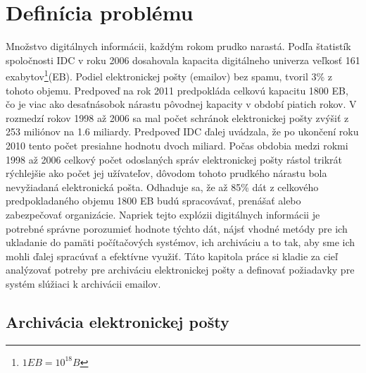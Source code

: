 \documentclass[11pt,twoside,a4paper]{book}
\begin{document}
\chapter{Definícia problému}

Množstvo digitálnych informácii, každým rokom prudko narastá. Podľa štatistík spoločnosti IDC\cite{Gantz_Mcarthur_Minton_2007} v roku 2006 dosahovala kapacita digitálneho univerza veľkosť 161 exabytov\footnote{$1 EB = 10^{18}B$}(EB). Podiel elektronickej pošty (emailov) bez spamu, tvoril 3\% z tohoto objemu. Predpoveď na rok 2011\cite{Gantz_Chute_Manfrediz_Minton_Reinsel_Schlichting_Toncheva_2008} predpokláda celkovú kapacitu 1800 EB, čo je viac ako desaťnásobok nárastu pôvodnej kapacity v období piatich rokov. V rozmedzí rokov 1998 až 2006 sa mal počet schránok elektronickej pošty zvýšiť z 253 miliónov na 1.6 miliardy. Predpoveď IDC ďalej uvádzala, že po ukončení roku 2010 tento počet presiahne hodnotu dvoch miliard. Počas obdobia medzi rokmi 1998 až 2006 celkový počet odoslaných správ elektronickej pošty rástol trikrát rýchlejšie ako počet jej užívateľov, dôvodom tohoto prudkého nárastu bola nevyžiadaná elektronická pošta. Odhaduje sa, že až 85\% dát z celkového predpokladaného objemu 1800 EB budú spracovávať, prenášať alebo zabezpečovať organizácie. Napriek tejto explózii digitálnych informácii je potrebné správne porozumieť hodnote týchto dát, nájsť vhodné metódy pre ich ukladanie do pamäti počítačových systémov, ich archiváciu a to tak, aby sme ich mohli ďalej spracúvať a efektívne využiť. Táto kapitola práce si kladie za cieľ analýzovať potreby pre archiváciu elektronickej pošty a definovať požiadavky pre systém slúžiaci k archivácii emailov.


\section{Archivácia elektronickej pošty}

\end{document}
